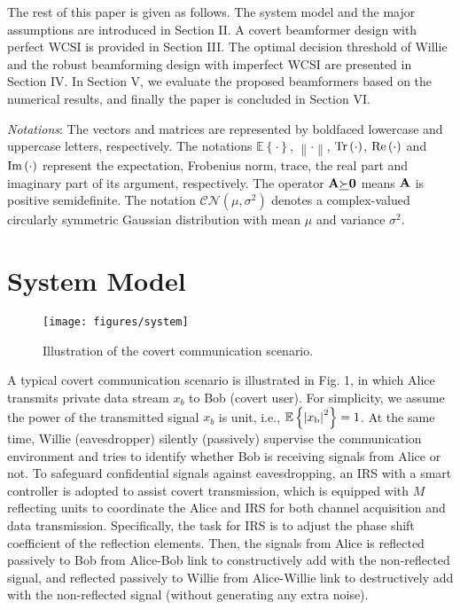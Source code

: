 \documentclass[10pt,journal,letterpaper,twocolumn,twoside]{IEEEtran} %
\begin{document}
 The rest of this paper is given as follows. The
system model and the major assumptions are introduced in Section II.
A covert beamformer design with perfect WCSI is provided in Section III.
     The optimal   decision    threshold of  Willie  and the robust beamforming design with imperfect WCSI are presented in Section IV.
        In Section V, we evaluate the proposed beamformers based on
 the numerical results, and finally the paper
is concluded in Section   VI.

\emph{Notations}:  The vectors and matrices are represented by
boldfaced lowercase and uppercase letters, respectively.
The notations ${{\mathbb E}}\left\{  \cdot  \right\}$,
$\left\|  \cdot  \right\|$, ${\rm{Tr}}\left(  \cdot  \right)$, ${\mathop{\rm Re}\nolimits} \left(  \cdot  \right)$ and  ${\mathop{\rm Im}\nolimits} \left(  \cdot  \right)$ represent
the expectation,  Frobenius norm,  trace, the real part and imaginary part of its argument, respectively.
 The operator ${\bf{A}}\underline  \succ  {\bf{0}}$ means ${\bf{A}}$ is positive semidefinite.
The notation $\mathcal{CN}\left( {\mu ,{\sigma ^2}} \right)$ denotes a complex-valued circularly symmetric Gaussian distribution with   mean   $\mu$ and  variance   ${\sigma ^2}$.


\section{System Model}
\begin{figure}[h]
      \centering
	\texttt{[image: figures/system]}
 \caption{ Illustration of  the covert communication scenario.}
  \label{system} %
\end{figure}

A typical covert communication scenario is illustrated in Fig. 1, in which
Alice  transmits private data stream ${x_b}$  to Bob (covert user). For simplicity,  we assume  the power of the transmitted signal ${x_b}$ is unit, i.e., ${{\mathbb E}}\left\{ {{{\left| {{x_{\rm{b}}}} \right|}^2}} \right\} = 1$. At the same time, Willie (eavesdropper) silently (passively) supervise the communication environment and tries to identify whether Bob is receiving signals from Alice or not.
To safeguard  confidential signals
against eavesdropping, an IRS with a smart controller is adopted
to assist covert transmission, which is equipped with  $M$ reflecting units to coordinate the Alice and IRS for both channel acquisition and data transmission.
Specifically, the task for IRS is to adjust the phase shift coefficient of the reflection elements. Then, the signals from Alice is reflected passively to Bob from Alice-Bob link to constructively add with the non-reflected signal, and reflected passively to Willie from Alice-Willie link to destructively add with the non-reflected signal (without generating any extra noise).
\end{document}

